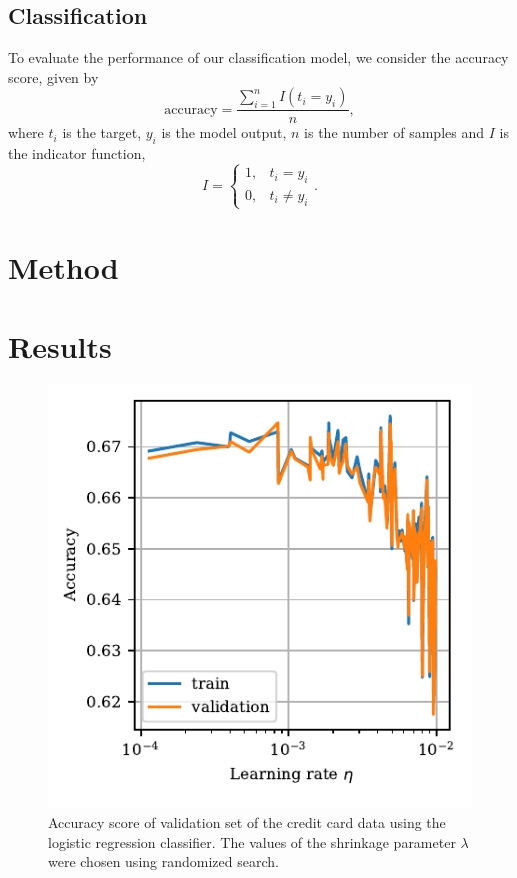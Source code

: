 \documentclass[a4paper, 11pt, twocolumn]{article}
\begin{document}
\subsection{Classification}
To evaluate the performance of our classification model, we consider the accuracy score, given by 
\begin{equation}
\label{eq:accuracy}
\text{accuracy}=\frac{\sum_{i=1}^nI(t_i=y_i)}{n},
\end{equation}
where $t_i$ is the target, $y_i$ is the model output, $n$ is the number of samples and $I$ is the indicator function, 
\[
I = \begin{cases} 
1, & t_i = y_i\\
0, & t_i \neq y_i
\end{cases} .
\]

\section{Method}




\section{Results}

\begin{figure}[H]
	\includegraphics[scale=1]{figures/logreg_learning_rate_accuracy.pdf}
	\caption{Accuracy score of validation set of the credit card data using the logistic regression classifier. The values of the shrinkage parameter $\lambda$ were chosen using randomized search.}
\end{figure}
\end{document}
